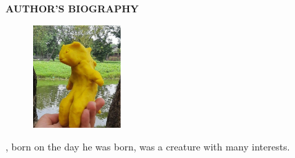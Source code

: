\begin{center}
  \Large
  \textbf{AUTHOR'S BIOGRAPHY}
\end{center}


\vspace{2ex}

\begin{figure}
  \centering
  \vspace{-3ex}
  \includegraphics[width=0.3\textwidth]{figures/yellow.png}
  \vspace{-4ex}
\end{figure}

\name{}, born on the day he was born, was a creature with many interests.
\lipsum[1-2]
%



